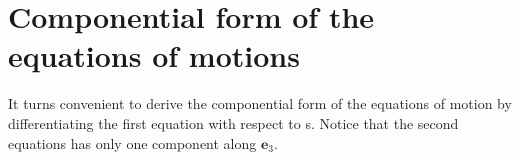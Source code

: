 

\section{Componential form of the equations of motions}\label{componential-form-of-the-equations-of-motion}
It turns convenient to derive the componential form of the equations of motion by differentiating the first equation with respect to s.
Notice that the second equations has only one component along $\mathbf{e}_3$.
 
 
 
 
 
 
  
  
  